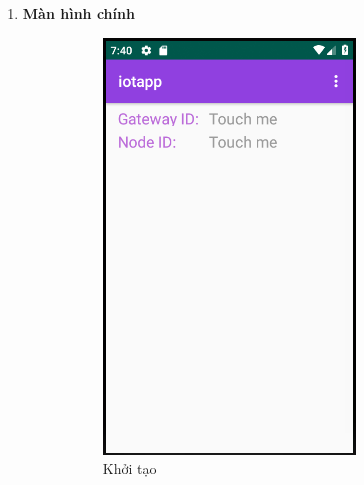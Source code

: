 \documentclass[a4paper]{article}
\begin{document}
\begin{enumerate}
	\item \textbf{Màn hình chính}\\
	\begin{figure}[!tbp]
\centering
  \begin{subfigure}[b]{0.3\textwidth}
    \includegraphics[width=\textwidth]{DefaultHome.png}
    \caption{Khởi tạo}
    \label{fig:DefaultHomeApp}
  \end{subfigure}
  \begin{subfigure}[b]{0.3\textwidth}

\end{subfigure}
\end{figure}
\end{enumerate}
\end{document}
